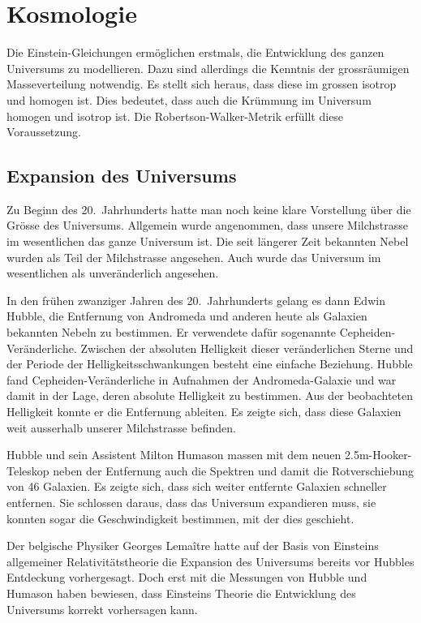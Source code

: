 %
%
%
\chapter{Kosmologie%
\label{skript:chapter:kosmologie}}
\rhead{}
Die Einstein-Gleichungen ermöglichen erstmals, die Entwicklung
des ganzen Universums zu modellieren.
Dazu sind allerdings die Kenntnis der grossräumigen
Masseverteilung notwendig.
Es stellt sich heraus, dass diese im grossen isotrop und homogen ist.
Dies bedeutet, dass auch die Krümmung im Universum homogen und isotrop
ist.
Die Robertson-Walker-Metrik erfüllt diese Voraussetzung.

\section{Expansion des Universums}
Zu Beginn des 20.~Jahrhunderts hatte man noch keine klare Vorstellung
über die Grösse des Universums.
Allgemein wurde angenommen, dass unsere Milchstrasse im wesentlichen das
ganze Universum ist.
Die seit längerer Zeit bekannten Nebel wurden als Teil der Milchstrasse
angesehen.
Auch wurde das Universum im wesentlichen als unveränderlich angesehen.

In den frühen zwanziger Jahren des 20.~Jahrhunderts gelang es dann
Edwin Hubble, die Entfernung von Andromeda und anderen heute als
Galaxien bekannten Nebeln zu bestimmen.
Er verwendete dafür sogenannte Cepheiden-Veränderliche.
Zwischen der absoluten Helligkeit dieser veränderlichen
Sterne und der Periode der Helligkeitsschwankungen besteht
eine einfache Beziehung.
Hubble fand Cepheiden-Veränderliche in Aufnahmen der Andromeda-Galaxie
und war damit in der Lage, deren absolute Helligkeit zu bestimmen.
Aus der beobachteten Helligkeit konnte er die Entfernung ableiten.
Es zeigte sich, dass diese Galaxien weit ausserhalb unserer Milchstrasse
befinden.

Hubble und sein Assistent Milton Humason massen mit dem neuen
2.5m-Hooker-Teleskop neben der Entfernung auch die Spektren und
damit die Rotverschiebung von 46 Galaxien.
Es zeigte sich, dass sich weiter entfernte Galaxien schneller 
entfernen.
Sie schlossen daraus, dass das Universum expandieren muss, sie konnten
sogar die Geschwindigkeit bestimmen, mit der dies geschieht.

Der belgische Physiker
Georges Lemaître hatte auf der Basis von Einsteins allgemeiner
Relativitätstheorie die Expansion des Universums bereits vor
Hubbles Entdeckung vorhergesagt.
Doch erst mit die Messungen von Hubble und Humason haben bewiesen,
dass Einsteins Theorie die Entwicklung des Universums korrekt
vorhersagen kann.

